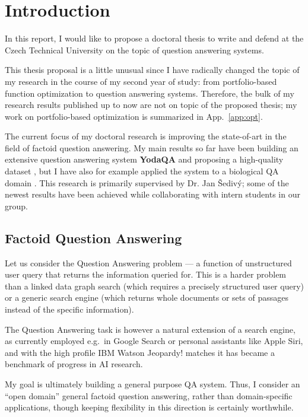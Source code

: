 \chapter{Introduction}
\label{ch:intro}

In this report, I would like to propose a doctoral thesis to write
and defend at the Czech Technical University on the topic of question
answering systems.

This thesis proposal is a little unusual since I have radically changed
the topic of my research in the course of my second year of study:
from portfolio-based function optimization to question answering systems.
Therefore, the bulk of my research results published up to now are not
on topic of the proposed thesis; my work on portfolio-based optimization
is summarized in App.~\ref{app:opt}.

The current focus of my doctoral research
is improving the state-of-art in the field of factoid question answering.
My main results so far have been
building an extensive question answering system \textbf{YodaQA} \citep{YodaQAPoster2015}
and proposing a high-quality dataset \citep{YodaQACLEF2015},
but I have also for example applied the system to a biological QA domain \citep{YodaQABioASQ2015}.
This research is primarily supervised by Dr. Jan Šedivý;
some of the newest results have been achieved while collaborating
with intern students in our group.

\section{Factoid Question Answering}

Let us consider the Question Answering problem --- a function of
unstructured user query that returns the information queried for.
This is a harder problem than a linked data graph search (which requires
a precisely structured user query) or a generic search engine (which
returns whole documents or sets of passages instead of the specific
information).

The Question Answering task is however a natural extension of a search
engine, as currently employed e.g.\ in Google Search \citep{googleKG}
or personal assistants like Apple Siri, and with the high
profile IBM Watson Jeopardy! matches \citep{WatsonOverview}
it has became a benchmark of progress in AI research.

My goal is ultimately building a general purpose QA system.
Thus, I consider an ``open domain'' general factoid question answering,
rather than domain-specific applications, though keeping flexibility
in this direction is certainly worthwhile.

